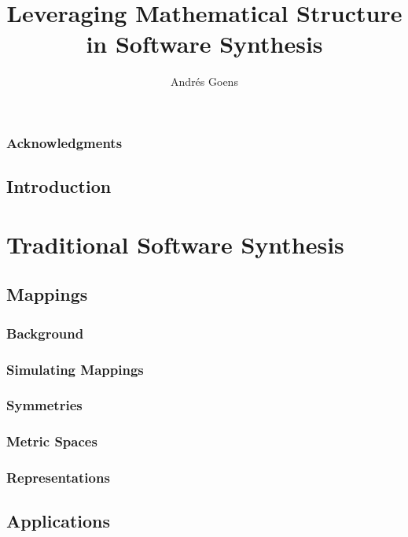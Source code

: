 \documentclass{report}
\title{Leveraging Mathematical Structure in Software Synthesis}
\author{Andr\'{e}s Goens}
\begin{document}
\date{}

\maketitle
\tableofcontents
\clearpage
\section*{Acknowledgments}


\chapter{Introduction}


\part{Traditional Software Synthesis}

\chapter{Mappings}

\section{Background}

\section{Simulating Mappings}

\section{Symmetries}
\section{Metric Spaces}
\section{Representations}

%

\chapter{Applications}

\end{document}

